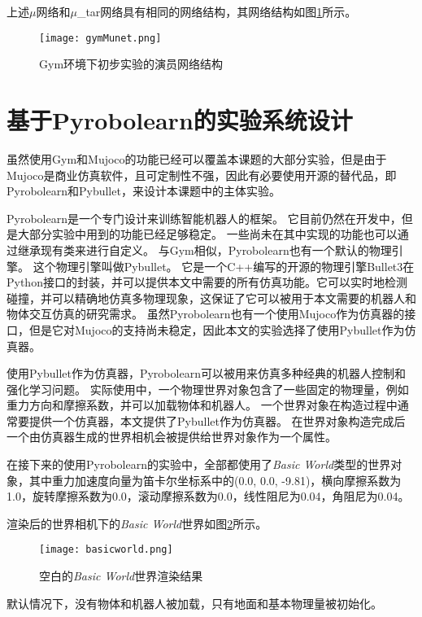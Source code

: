上述$\mu$网络和$\mu$\_tar网络具有相同的网络结构，其网络结构如图\ref{gymMunet}所示。
    \begin{figure}[htpb]
        \centering
        \texttt{[image: gymMunet.png]}
        \caption{Gym环境下初步实验的演员网络结构}
        \label{gymMunet}
    \end{figure}

\section{基于Pyrobolearn的实验系统设计}\label{myenvexp}
虽然使用Gym和Mujoco的功能已经可以覆盖本课题的大部分实验，但是由于Mujoco是商业仿真软件，且可定制性不强，因此有必要使用开源的替代品，即Pyrobolearn和Pybullet，来设计本课题中的主体实验。

Pyrobolearn是一个专门设计来训练智能机器人的框架\cite{delhaisse2019pyrobolearn}。
它目前仍然在开发中，但是大部分实验中用到的功能已经足够稳定。
一些尚未在其中实现的功能也可以通过继承现有类来进行自定义。
与Gym相似，Pyrobolearn也有一个默认的物理引擎。
这个物理引擎叫做Pybullet\cite{coumans2016pybullet}。
它是一个C++编写的开源的物理引擎Bullet3在Python接口的封装，并可以提供本文中需要的所有仿真功能。它可以实时地检测碰撞，并可以精确地仿真多物理现象，这保证了它可以被用于本文需要的机器人和物体交互仿真的研究需求。
虽然Pyrobolearn也有一个使用Mujoco作为仿真器的接口，但是它对Mujoco的支持尚未稳定，因此本文的实验选择了使用Pybullet作为仿真器。

使用Pybullet作为仿真器，Pyrobolearn可以被用来仿真多种经典的机器人控制和强化学习问题。
实际使用中，一个物理世界对象包含了一些固定的物理量，例如重力方向和摩擦系数，并可以加载物体和机器人。
一个世界对象在构造过程中通常要提供一个仿真器，本文提供了Pybullet作为仿真器。
在世界对象构造完成后一个由仿真器生成的世界相机会被提供给世界对象作为一个属性。

在接下来的使用Pyrobolearn的实验中，全部都使用了\emph{Basic World}类型的世界对象，其中重力加速度向量为笛卡尔坐标系中的(0.0, 0.0, -9.81)，横向摩擦系数为1.0，旋转摩擦系数为0.0，滚动摩擦系数为0.0，线性阻尼为0.04，角阻尼为0.04。

渲染后的世界相机下的\emph{Basic World}世界如图\ref{basicworld}所示。
    \begin{figure}[htpb]
        \centering
        \texttt{[image: basicworld.png]}
        \caption{空白的\emph{Basic World}世界渲染结果}
        \label{basicworld}
    \end{figure}
默认情况下，没有物体和机器人被加载，只有地面和基本物理量被初始化。

